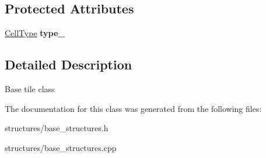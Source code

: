 \subsection*{Protected Attributes}
\begin{DoxyCompactItemize}
\item 
\mbox{\label{classbase__structures_1_1Cell_a49624a8c3168aa4e68b0aee2116eb982}} 
\hyperlink{group__map__interface_ga7a79b122dbd494c4eea32680c5df34c1}{Cell\+Type} {\bfseries type\+\_\+}
\end{DoxyCompactItemize}


\subsection{Detailed Description}
Base tile class 

The documentation for this class was generated from the following files\+:\begin{DoxyCompactItemize}
\item 
structures/base\+\_\+structures.\+h\item 
structures/base\+\_\+structures.\+cpp\end{DoxyCompactItemize}

